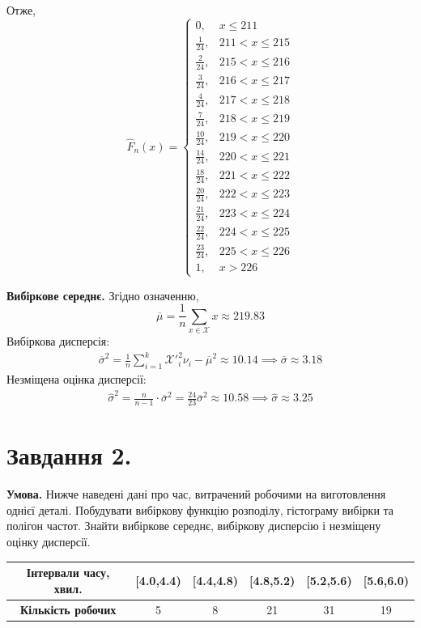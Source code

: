 \documentclass[14pt]{extarticle}
\begin{document}
Отже,
\[
\hat{F}_n(x) = \begin{cases}
    0, & x \leq 211 \\
    \frac{1}{24}, & 211 < x \leq 215 \\
    \frac{2}{24}, & 215 < x \leq 216 \\
    \frac{3}{24}, & 216 < x \leq 217 \\
    \frac{4}{24}, & 217 < x \leq 218 \\
    \frac{7}{24}, & 218 < x \leq 219 \\
    \frac{10}{24}, & 219 < x \leq 220 \\
    \frac{14}{24}, & 220 < x \leq 221 \\
    \frac{18}{24}, & 221 < x \leq 222 \\
    \frac{20}{24}, & 222 < x \leq 223 \\
    \frac{21}{24}, & 223 < x \leq 224 \\
    \frac{22}{24}, & 224 < x \leq 225 \\
    \frac{23}{24}, & 225 < x \leq 226 \\
    1, & x > 226
\end{cases}
\]

\textbf{Вибіркове середнє.} Згідно означенню,
\[
\overline{\mu} = \frac{1}{n}\sum_{x \in \mathcal{X}} x \approx 219.83
\]
Вибіркова дисперсія:
\begin{gather*}
\overline{\sigma}^2 = \frac{1}{n}\sum_{i=1}^k \mathcal{X}'_i^2\nu_i- \overline{\mu}^2 \approx 10.14 \implies \overline{\sigma}\approx 3.18
\end{gather*}
Незміщена оцінка дисперсії:
\begin{gather*}
    \hat{\sigma}^2 = \frac{n}{n-1}\cdot\overline{\sigma}^2 = \frac{24}{23}\overline{\sigma}^2 \approx 10.58 \implies \hat{\sigma} \approx 3.25
\end{gather*}

\pagebreak
\section*{Завдання 2.}
\textbf{Умова.} Нижче наведені дані про час, витрачений робочими на виготовлення
однієї деталі. Побудувати вибіркову функцію розподілу, гістограму
вибірки та полігон частот. Знайти вибіркове середнє, вибіркову
дисперсію і незміщену оцінку дисперсії.
\begin{center}
\begin{tabular}{ |c|c|c|c|c|c| } 
\hline
\textbf{Інтервали часу, хвил.} & [4.0,4.4) & [4.4,4.8) & [4.8,5.2) & [5.2,5.6) & [5.6,6.0) \\ \hline
\textbf{Кількість робочих} & 5 & 8 & 21 & 31 & 19 \\ \hline
\end{tabular}
\end{center}
\end{document}
